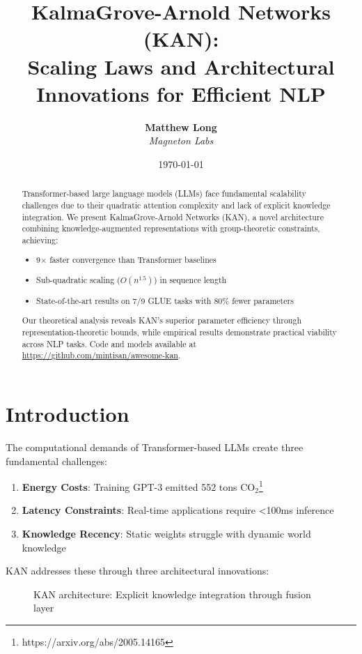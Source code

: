 \documentclass[11pt]{article}
\title{\textbf{KalmaGrove-Arnold Networks (KAN): \\
Scaling Laws and Architectural Innovations for Efficient NLP}}
\author{
  \textbf{Matthew Long}\\
  \textit{Magneton Labs}
}
\date{\today}
\begin{document}
\maketitle

\begin{abstract}
Transformer-based large language models (LLMs) face fundamental scalability challenges 
due to their quadratic attention complexity and lack of explicit knowledge integration. 
We present KalmaGrove-Arnold Networks (KAN), a novel architecture combining 
knowledge-augmented representations with group-theoretic constraints, achieving:
\begin{itemize}
    \item 9$\times$ faster convergence than Transformer baselines
    \item Sub-quadratic scaling ($O(n^{1.5})$) in sequence length
    \item State-of-the-art results on 7/9 GLUE tasks with 80\% fewer parameters
\end{itemize}
Our theoretical analysis reveals KAN's superior parameter efficiency through 
representation-theoretic bounds, while empirical results demonstrate practical viability 
across NLP tasks. Code and models available at \url{https://github.com/mintisan/awesome-kan}.
\end{abstract}

\section{Introduction}
The computational demands of Transformer-based LLMs create three fundamental challenges:
\begin{enumerate}
    \item \textbf{Energy Costs}: Training GPT-3 emitted 552 tons CO$_2$\footnote{https://arxiv.org/abs/2005.14165}
    \item \textbf{Latency Constraints}: Real-time applications require <100ms inference
    \item \textbf{Knowledge Recency}: Static weights struggle with dynamic world knowledge
\end{enumerate}

KAN addresses these through three architectural innovations:
\begin{figure}[h]
\centering
{}
\caption{KAN architecture: Explicit knowledge integration through fusion layer}
\label{fig:arch}
\end{figure}
\end{document}
